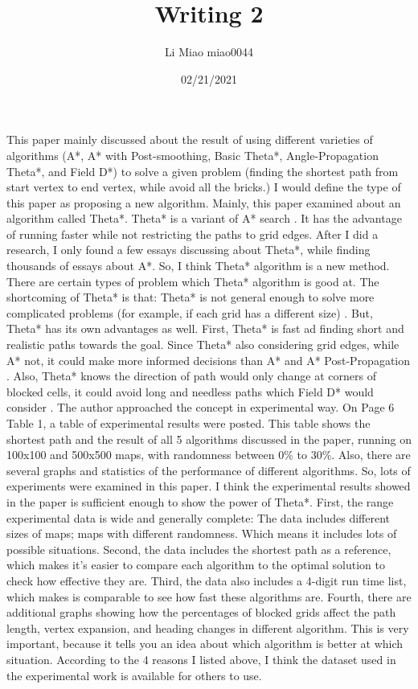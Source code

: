 \documentclass{article}
\title{Writing 2}
\author{Li Miao   miao0044}
\date{02/21/2021}
\begin{document}
\maketitle
\noindent
This paper mainly discussed about the result of using different varieties of algorithms (A*, A* with Post-smoothing, Basic Theta*, Angle-Propagation Theta*, and Field D*) to solve a given problem (finding the shortest path from start vertex to end vertex, while avoid all the bricks.)
\newline
\newline
I would define the type of this paper as proposing a new algorithm. Mainly, this paper examined about an algorithm called Theta*. Theta* is a variant of A* search \cite{nash2007theta}. It has the advantage of running faster while not restricting the paths to grid edges. After I did a research, I only found a few essays discussing about Theta*, while finding thousands of essays about A*. So, I think Theta* algorithm is a new method.
\newline
\newline
There are certain types of problem which Theta* algorithm is good at. The shortcoming of Theta* is that: Theta* is not general enough to solve more complicated problems (for example, if each grid has a different size) \cite{nash2007theta}. But, Theta* has its own advantages as well. First, Theta* is fast ad finding short and realistic paths towards the goal. Since Theta* also considering grid edges, while A* not, it could make more informed decisions than A* and A* Post-Propagation \cite{nash2007theta}. Also, Theta* knows the direction of path would only change at corners of blocked cells, it could avoid long and needless paths which Field D* would consider \cite{nash2007theta}.
\newline
\newline
The author approached the concept in experimental way. On Page 6 Table 1, a table of experimental results were posted. This table shows the shortest path and  the result of all 5 algorithms discussed in the paper, running on 100x100 and 500x500 maps, with randomness between 0\% to 30\%. Also, there are several graphs and statistics of the performance of different algorithms. So, lots of experiments were examined in this paper.
\newline
\newline
I think the experimental results showed in the paper is sufficient enough to show the power of Theta*. First, the range experimental data is wide and generally complete: The data includes different sizes of maps; maps with different randomness. Which means it includes lots of possible situations. Second, the data includes the shortest path as a reference, which makes it’s easier to compare each algorithm to the optimal solution to check how effective they are. Third, the data also includes a 4-digit run time list, which makes is comparable to see how fast these algorithms are. Fourth, there are additional graphs showing how the percentages of blocked grids affect the path length, vertex expansion, and heading changes in different algorithm. This is very important, because it tells you an idea about which algorithm is better at which situation. According to the 4 reasons I listed above, I think the dataset used in the experimental work is available for others to use.
\end{document}
